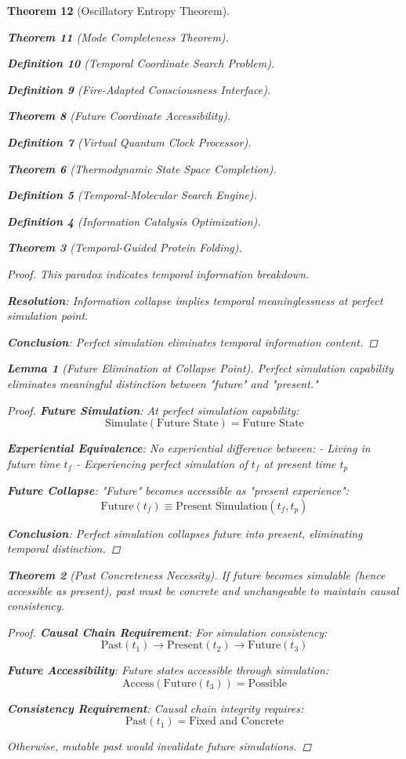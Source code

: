 \documentclass[12pt,a4paper]{article}
\newtheorem{theorem}{Theorem}[section]
\newtheorem{lemma}[theorem]{Lemma}
\newtheorem{definition}[theorem]{Definition}
\begin{document}
\begin{theorem}[Oscillatory Entropy Theorem]
\begin{theorem}[Mode Completeness Theorem]
\begin{enumerate}
\begin{definition}[Temporal Coordinate Search Problem]
\begin{algorithm}
\begin{definition}[Fire-Adapted Consciousness Interface]
\begin{theorem}[Future Coordinate Accessibility]
\begin{definition}[Virtual Quantum Clock Processor]
\begin{itemize}
\begin{itemize}
\begin{theorem}[Thermodynamic State Space Completion]
\begin{definition}[Temporal-Molecular Search Engine]
\begin{definition}[Information Catalysis Optimization]
\begin{algorithm}
\begin{theorem}[Temporal-Guided Protein Folding]
\begin{table}[h]
\begin{proof}
This paradox indicates temporal information breakdown.

\textbf{Resolution}: Information collapse implies temporal meaninglessness at perfect simulation point.

\textbf{Conclusion}: Perfect simulation eliminates temporal information content.
\end{proof}

\begin{lemma}[Future Elimination at Collapse Point]
Perfect simulation capability eliminates meaningful distinction between "future" and "present."
\end{lemma}

\begin{proof}
\textbf{Future Simulation}: At perfect simulation capability:
$$\text{Simulate}(\text{Future State}) = \text{Future State}$$

\textbf{Experiential Equivalence}: No experiential difference between:
- Living in future time $t_f$
- Experiencing perfect simulation of $t_f$ at present time $t_p$

\textbf{Future Collapse}: "Future" becomes accessible as "present experience":
$$\text{Future}(t_f) \equiv \text{Present Simulation}(t_f, t_p)$$

\textbf{Conclusion}: Perfect simulation collapses future into present, eliminating temporal distinction.
\end{proof}

\begin{theorem}[Past Concreteness Necessity]
If future becomes simulable (hence accessible as present), past must be concrete and unchangeable to maintain causal consistency.
\end{theorem}

\begin{proof}
\textbf{Causal Chain Requirement}: For simulation consistency:
$$\text{Past}(t_1) \to \text{Present}(t_2) \to \text{Future}(t_3)$$

\textbf{Future Accessibility}: Future states accessible through simulation:
$$\text{Access}(\text{Future}(t_3)) = \text{Possible}$$

\textbf{Consistency Requirement}: Causal chain integrity requires:
$$\text{Past}(t_1) = \text{Fixed and Concrete}$$

Otherwise, mutable past would invalidate future simulations.


\end{proof}
\end{table}
\end{theorem}
\end{algorithm}
\end{definition}
\end{definition}
\end{theorem}
\end{itemize}
\end{itemize}
\end{definition}
\end{theorem}
\end{definition}
\end{algorithm}
\end{definition}
\end{enumerate}
\end{theorem}
\end{theorem}
\end{document}
